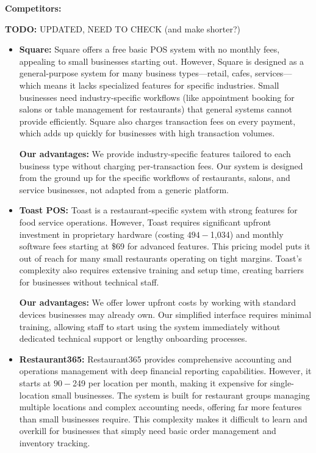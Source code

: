 \documentclass[]{VUMIFTemplateClass}
\newcommand{\todocomment}[1]{%
    \begin{tcolorbox}[colback=red!20, colframe=red!60, arc=0pt, outer arc=0pt, boxrule=1pt, left=3pt, right=3pt, top=3pt, bottom=3pt]
        \textbf{\textcolor{orange!70!black}{TODO:}} #1
    \end{tcolorbox}
}
\begin{document}
\textbf{Competitors:}
\todocomment{UPDATED, NEED TO CHECK (and make shorter?)}
\begin{itemize}
    \item \textbf{Square:} Square offers a free basic POS system with no monthly
    fees, appealing to small businesses starting out. However, Square is
    designed as a general-purpose system for many business types—retail, cafes,
    services—which means it lacks specialized features for specific industries.
    Small businesses need industry-specific workflows (like appointment booking
    for salons or table management for restaurants) that general systems cannot
    provide efficiently. Square also charges transaction fees on every payment,
    which adds up quickly for businesses with high transaction volumes.
    
    \textbf{Our advantages:} We provide industry-specific features tailored to
    each business type without charging per-transaction fees. Our system is
    designed from the ground up for the specific workflows of restaurants,
    salons, and service businesses, not adapted from a generic platform.
    
    \item \textbf{Toast POS:} Toast is a restaurant-specific system with strong
    features for food service operations. However, Toast requires significant
    upfront investment in proprietary hardware (costing $494-$1,034) and monthly
    software fees starting at \$69 for advanced features. This pricing model
    puts it out of reach for many small restaurants operating on tight margins.
    Toast's complexity also requires extensive training and setup time, creating
    barriers for businesses without technical staff.
    
    \textbf{Our advantages:} We offer lower upfront costs by working with
    standard devices businesses may already own. Our simplified interface
    requires minimal training, allowing staff to start using the system
    immediately without dedicated technical support or lengthy onboarding
    processes.
    
    \item \textbf{Restaurant365:} Restaurant365 provides comprehensive
    accounting and operations management with deep financial reporting
    capabilities. However, it starts at $90-$249 per location per month, making
    it expensive for single-location small businesses. The system is built for
    restaurant groups managing multiple locations and complex accounting needs,
    offering far more features than small businesses require. This complexity
    makes it difficult to learn and overkill for businesses that simply need
    basic order management and inventory tracking.
    

\end{itemize}
\end{document}
